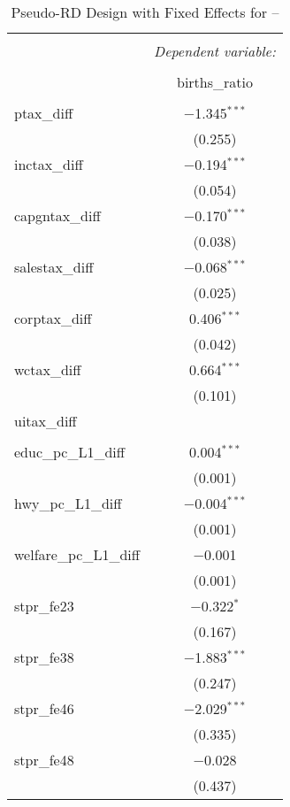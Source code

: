 
\begin{table}[!htbp] \centering 
  \caption{Pseudo-RD Design with Fixed Effects for  --} 
  \label{} 
\begin{tabular}{@{\extracolsep{5pt}}lc} 
\\[-1.8ex]\hline 
\hline \\[-1.8ex] 
 & \multicolumn{1}{c}{\textit{Dependent variable:}} \\ 
\cline{2-2} 
\\[-1.8ex] & births\_ratio \\ 
\hline \\[-1.8ex] 
 ptax\_diff & $-$1.345$^{***}$ \\ 
  & (0.255) \\ 
  inctax\_diff & $-$0.194$^{***}$ \\ 
  & (0.054) \\ 
  capgntax\_diff & $-$0.170$^{***}$ \\ 
  & (0.038) \\ 
  salestax\_diff & $-$0.068$^{***}$ \\ 
  & (0.025) \\ 
  corptax\_diff & 0.406$^{***}$ \\ 
  & (0.042) \\ 
  wctax\_diff & 0.664$^{***}$ \\ 
  & (0.101) \\ 
  uitax\_diff &  \\ 
  &  \\ 
  educ\_pc\_L1\_diff & 0.004$^{***}$ \\ 
  & (0.001) \\ 
  hwy\_pc\_L1\_diff & $-$0.004$^{***}$ \\ 
  & (0.001) \\ 
  welfare\_pc\_L1\_diff & $-$0.001 \\ 
  & (0.001) \\ 
  stpr\_fe23 & $-$0.322$^{*}$ \\ 
  & (0.167) \\ 
  stpr\_fe38 & $-$1.883$^{***}$ \\ 
  & (0.247) \\ 
  stpr\_fe46 & $-$2.029$^{***}$ \\ 
  & (0.335) \\ 
  stpr\_fe48 & $-$0.028 \\ 
  & (0.437) \\ 

\end{tabular}
\end{table}
